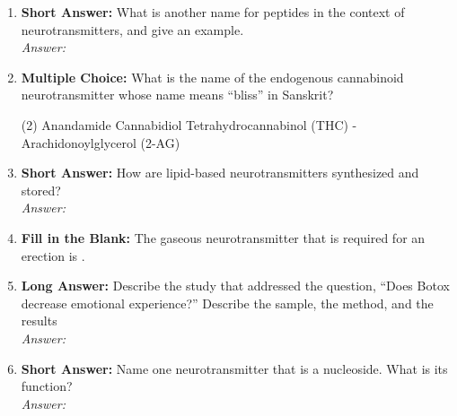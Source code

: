 \begin{enumerate}[label=\textbf{Q3.3.\arabic*}]
    \item \textbf{Short Answer:} What is another name for peptides in the context of neurotransmitters, and give an example. \\ 
        \textit{Answer:} \\%

    \item \textbf{Multiple Choice:} What is the name of the endogenous cannabinoid neurotransmitter whose name means ``bliss'' in Sanskrit?
        \begin{tasks}[label=\textcolor{\documentTheme}{(\Alph*)}, item-format=\color{\documentTheme}, label-width=1.5em, item-indent=1.7em](2)
            \task Anandamide
            \task Cannabidiol
            \task Tetrahydrocannabinol (THC)
            -Arachidonoylglycerol (2-AG)
        \end{tasks}

    \item \textbf{Short Answer:} How are lipid-based neurotransmitters synthesized and stored? \\
        \textit{Answer:} \\%

    \item \textbf{Fill in the Blank:} The gaseous neurotransmitter that is required for an erection is \underline{\hspace{3cm}}.

    \item \textbf{Long Answer:} Describe the study that addressed the question, ``Does Botox decrease emotional experience?'' Describe the sample, the method, and the results \\
        \textit{Answer:} %

    \item \textbf{Short Answer:} Name one neurotransmitter that is a nucleoside. What is its function? \\
        \textit{Answer:} \\%


\end{enumerate}
